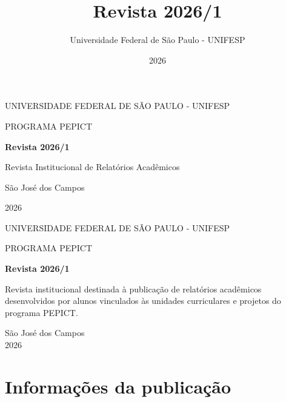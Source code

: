 \documentclass[12pt,openright,oneside,a4paper]{report}
\title{Revista 2026/1}
\author{Universidade Federal de São Paulo - UNIFESP}
\date{2026}
\begin{document}
\begin{titlepage}
    \centering
    \vspace*{2cm}
    {\Large UNIVERSIDADE FEDERAL DE SÃO PAULO - UNIFESP \par}
    \vspace{0.5cm}
    {\large PROGRAMA PEPICT \par}
    \vfill
    {\bfseries\LARGE Revista 2026/1 \par}
    \vspace{1cm}
    {\large Revista Institucional de Relatórios Acadêmicos \par}
    \vfill
    {\large São José dos Campos\par}
    {\large 2026 \par}
\end{titlepage}

\begin{titlepage}
    \centering
    {\Large UNIVERSIDADE FEDERAL DE SÃO PAULO - UNIFESP \par}
    \vspace{0.5cm}
    {\large PROGRAMA PEPICT \par}
    \vspace{4cm}
    {\bfseries\LARGE Revista 2026/1 \par}
    \vspace{2cm}
    \hspace{.45\textwidth}
    \begin{minipage}{.5\textwidth}
        \onehalfspacing
        Revista institucional destinada à publicação de relatórios acadêmicos desenvolvidos por alunos vinculados às unidades curriculares e projetos do programa PEPICT.
    \end{minipage}
    \vfill
    \begin{center}
        São José dos Campos \\
        2026
    \end{center}
\end{titlepage}

\chapter*{Informações da publicação}
\thispagestyle{empty}
\end{document}
